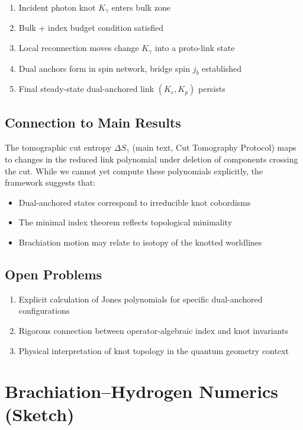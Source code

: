 \documentclass[11pt]{article}
\theoremstyle{plain}
\theoremstyle{definition}
\begin{document}
\begin{enumerate}[label=S\arabic*:]
  \item Incident photon knot $K_\gamma$ enters bulk zone
  \item Bulk + index budget condition satisfied
  \item Local reconnection moves change $K_\gamma$ into a proto-link state
  \item Dual anchors form in spin network, bridge spin $j_b$ established
  \item Final steady-state dual-anchored link $(K_e,K_p)$ persists
\end{enumerate}

\subsection{Connection to Main Results}
The tomographic cut entropy $\Delta S_\gamma$ (main text, Cut Tomography Protocol) maps to changes in the reduced link polynomial under deletion of components crossing the cut. While we cannot yet compute these polynomials explicitly, the framework suggests that:
\begin{itemize}
  \item Dual-anchored states correspond to irreducible knot cobordisms
  \item The minimal index theorem reflects topological minimality
  \item Brachiation motion may relate to isotopy of the knotted worldlines
\end{itemize}

\subsection{Open Problems}
\begin{enumerate}
  \item Explicit calculation of Jones polynomials for specific dual-anchored configurations
  \item Rigorous connection between operator-algebraic index and knot invariants
  \item Physical interpretation of knot topology in the quantum geometry context
\end{enumerate}

\section{Brachiation–Hydrogen Numerics (Sketch)}
\label{app:brach-numerics}
\end{document}
